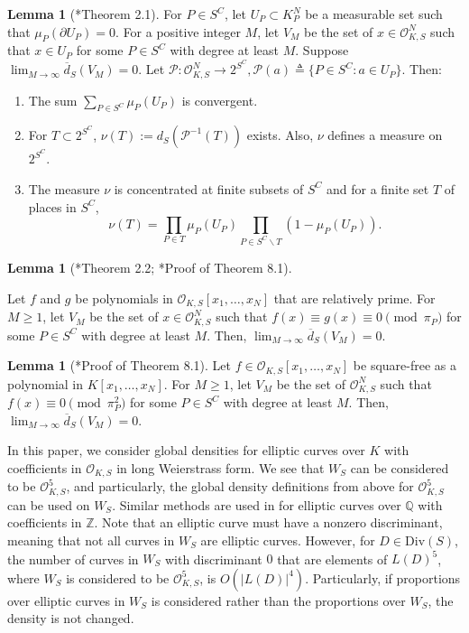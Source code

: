 \documentclass[12pt,letterpaper]{amsart}
\theoremstyle{definition}
\newtheorem{lemma}[theorem]{Lemma}
\begin{document}
\begin{lemma}[{\cite{globaldensityfunc}*{Theorem 2.1}}]
\label{globaldensity1}
For $P\in S^C$, let $U_P\subset K_P^N$ be a measurable set such that $\mu_P(\partial U_P)=0$. For a positive integer $M$, let $V_M$ be the set of $x\in \mathcal{O}_{K,S}^N$ such that $x\in U_P$ for some $P\in S^C$ with degree at least $M$. Suppose
$\lim_{M\rightarrow\infty}\overline{d}_S(V_M)=0$. Let $\mathcal{P}: \mathcal{O}_{K, S}^N\rightarrow 2^{S^C}, \mathcal{P}(a)\triangleq\{P\in S^C: a\in U_P\}$. Then:
\begin{enumerate}
    \item The sum $\sum_{P\in S^C}\mu_P(U_P)$ is convergent.
    \item For $T\subset 2^{S^C}$, $\nu(T):=d_S(\mathcal{P}^{-1}(T))$ exists. Also, $\nu$ defines a measure on $2^{S^C}$.
    \item The measure $\nu$ is concentrated at finite subsets of $S^C$ and for a finite set $T$ of places in $S^C$,
    \[
    \nu(T)=\prod_{P\in T}\mu_P(U_P)\prod_{P\in S^C\backslash T} (1-\mu_P(U_P)).
    \]
\end{enumerate}

\end{lemma}

\begin{lemma}[{\cite{globaldensityfunc}*{Theorem 2.2}}; {\cite{sqfree}*{Proof of Theorem 8.1}}]
\label{globaldensity2}

Let $f$ and $g$ be polynomials in $\mathcal{O}_{K, S}[x_1,\ldots,x_N]$ that are relatively prime. For $M\geq 1$, let $V_M$ be the set of $x\in \mathcal{O}_{K, S}^N$ such that $f(x)\equiv g(x)\equiv 0\pmod{\pi_P}$ for some $P\in S^C$ with degree at least $M$. Then, $\lim_{M\rightarrow\infty}\overline{d}_S(V_M)=0$.
\end{lemma}

\begin{lemma}[{\cite{sqfree}*{Proof of Theorem 8.1}}]
\label{lemma:sqfree}
Let $f\in\mathcal{O}_{K,S}[x_1,\ldots,x_N]$ be square-free as a polynomial in $K[x_1,\ldots,x_N]$. For $M\geq 1$, let $V_M$ be the set of $\mathcal{O}_{K,S}^N$ such that $f(x)\equiv 0 \pmod{\pi_P^2}$ for some $P\in S^C$ with degree at least $M$. Then, $\lim_{M\rightarrow\infty} \overline{d}_S(V_M)=0$.
\end{lemma}

In this paper, we consider global densities for elliptic curves over $K$ with coefficients in $\mathcal{O}_{K,S}$ in long Weierstrass form. We see that $W_S$ can be considered to be $\mathcal{O}_{K,S}^5$, and particularly, the global density definitions from above for $\mathcal{O}_{K,S}^5$ can be used on $W_S$. Similar methods are used in \cite{localglobal} for elliptic curves over $\mathbb{Q}$ with coefficients in $\mathbb{Z}$. Note that an elliptic curve must have a nonzero discriminant, meaning that not all curves in $W_S$ are elliptic curves. However, for $D\in \text{Div}(S)$, the number of curves in $W_S$ with discriminant $0$ that are elements of $L(D)^5$, where $W_S$ is considered to be $\mathcal{O}_{K,S}^5$, is $O(|L(D)|^4)$. Particularly, if proportions over elliptic curves in $W_S$ is considered rather than the proportions over $W_S$, the density is not changed.
\end{document}
